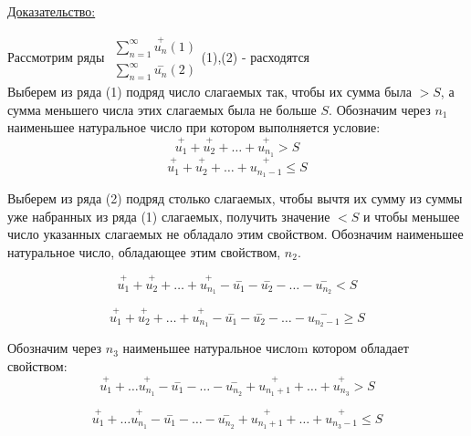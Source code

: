 \documentclass[12pt]{article}
\let\oldsum\sum
\renewcommand{\sum}{\oldsum\limits}
\begin{document}
  \underline{Доказательство:}
    \begin{adjustwidth}{1.5em}{1.5em}

    Рассмотрим ряды
    $
    \begin{matrix}
      \sum_{n=1}^{\infty} \overset{+}{u_n}(1)\\
      \sum_{n=1}^{\infty} \overset{-}{u_n}(2)
    \end{matrix}
    $(1),(2) - расходятся\\
    Выберем из ряда (1) подряд число слагаемых так, чтобы их сумма была $> S$, а сумма меньшего числа
    этих слагаемых была не больше $S$. Обозначим через $n_1$ наименьшее натуральное число при котором
    выполняется условие:
    \[\overset{+}{u_1}+\overset{+}{u_2}+\dots+\overset{+}{u_{n_1}} > S\]
    \[\overset{+}{u_1}+\overset{+}{u_2}+\dots+\overset{+}{u_{n_1-1}} \leq S\]

    Выберем из ряда (2) подряд столько слагаемых, чтобы вычтя их сумму из суммы уже набранных из ряда
    (1) слагаемых, получить значение $<S$ и чтобы меньшее число указанных слагаемых не обладало
    этим свойством. Обозначим наименьшее натуральное число, обладающее этим свойством, $n_2$.

    \[\overset{+}{u_1}+\overset{+}{u_2}+\dots+\overset{+}{u_{n_1}}-\overset{-}{u_1}-\overset{-}{u_2}-\dots-\overset{-}{u_{n_2}}<S\]

    \[\overset{+}{u_1}+\overset{+}{u_2}+\dots+\overset{+}{u_{n_1}}-\overset{-}{u_1}-\overset{-}{u_2}-\dots-\overset{-}{u_{n_2-1}} \geq S\]

    Обозначим через $n_3$ наименьшее натуральное числоm котором обладает свойством:
    \[\overset{+}{u_1}+\dots\overset{+}{u_{n_1}}-\overset{-}{u_1}-\dots -\overset{-}{u_{n_2}}+\overset{+}{u_{n_1+1}}+\dots+\overset{+}{u_{n_3}} > S\]

    \[\overset{+}{u_1}+\dots\overset{+}{u_{n_1}}-\overset{-}{u_1}-\dots -\overset{-}{u_{n_2}}+\overset{+}{u_{n_1+1}}+\dots+\overset{+}{u_{n_3-1}} \leq S\]


\end{adjustwidth}
\end{document}
